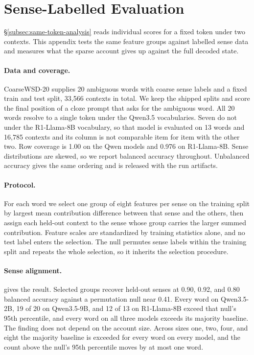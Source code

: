 
\section{Sense-Labelled Evaluation}\label{app:sense-labelled-evaluation}

\S\ref{subsec:same-token-analysis} reads individual scores for a fixed
token under two contexts. This appendix tests the same feature groups
against labelled sense data and measures what the sparse account gives
up against the full decoded state.

\paragraph{Data and coverage.}
CoarseWSD-20 \citep{loureiro2021coarsewsd} supplies 20 ambiguous words
with coarse sense labels and a fixed train and test split, 33{,}566
contexts in total. We keep the
shipped splits and score the final position of a cloze prompt that asks
for the ambiguous word. All 20 words resolve to a single token under
the Qwen3.5 vocabularies. Seven do not under the R1-Llama-8B
vocabulary, so that model is evaluated on 13 words and 16{,}785
contexts and its column is not comparable item for item with the other
two. Row coverage is 1.00 on the Qwen models and 0.976 on
R1-Llama-8B. Sense distributions are skewed, so we report balanced
accuracy throughout. Unbalanced accuracy gives the same ordering and is
released with the run artifacts.

\paragraph{Protocol.}
For each word we select one group of eight features per sense on the
training split by largest mean contribution difference between that
sense and the others, then assign each held-out context to the sense
whose group carries the larger summed contribution. Feature scales are
standardized by training statistics alone, and no test label enters the
selection. The null permutes sense labels within the training split and
repeats the whole selection, so it inherits the selection procedure.

\paragraph{Sense alignment.}
 gives the result. Selected groups recover
held-out senses at 0.90, 0.92, and 0.80 balanced accuracy against a
permutation null near 0.41. Every word on Qwen3.5-2B, 19 of 20 on
Qwen3.5-9B, and 12 of 13 on R1-Llama-8B exceed that null's 95th
percentile, and every word on all three models exceeds its majority
baseline. The finding does not depend on the account size. Across
sizes one, two, four, and eight the majority baseline is exceeded for
every word on every model, and the count above the null's 95th
percentile moves by at most one word.

